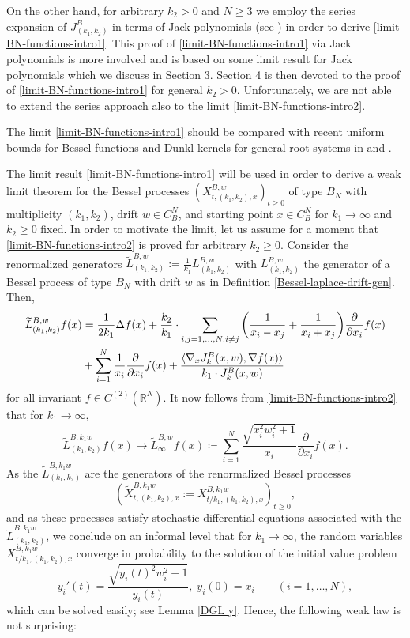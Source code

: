 \documentclass[reqno]{amsart}
\theoremstyle{plain}
\theoremstyle{definition}
\numberwithin{equation}{section}
\begin{document}
On the other hand, for arbitrary  $k_2>0$ and $N\ge3$
we  employ the series expansion of $J_{(k_1,k_2)}^B$ in terms of Jack polynomials (see \cite{Kan, FK, R4})
in order to derive \eqref{limit-BN-functions-intro1}.
This  proof of \eqref{limit-BN-functions-intro1} via Jack polynomials is more involved and is based on some limit result for Jack polynomials
which we  discuss in Section 3. Section 4 is then devoted to the proof of \eqref{limit-BN-functions-intro1} for general $k_2>0$.
Unfortunately, we are not able to extend the series approach also to the limit \eqref{limit-BN-functions-intro2}.

The limit \eqref{limit-BN-functions-intro1} should be compared with recent
uniform bounds for Bessel functions and Dunkl kernels for general root systems in \cite{L} and \cite{CLWW}.

The limit result 
\eqref{limit-BN-functions-intro1} will be used  in order to derive a weak limit theorem for the Bessel processes
$(X^{B,w}_{t,(k_1,k_2),x})_{t \geq 0}$ of type $B_N$ with multiplicity $(k_1,k_2)$,  drift $w \in C^N_B$, and starting point $x\in C^N_B$
for $k_1\to\infty$ and $k_2\ge0$ fixed. In order to motivate the limit, let us assume for a moment that
\eqref{limit-BN-functions-intro2} is proved for arbitrary $k_2\ge0$. Consider the renormalized
generators $\widetilde L_{(k_1,k_2)}^{B,w}:= \frac{1}{k_1} L_{(k_1,k_2)}^{B,w}$  with  $L_{(k_1,k_2)}^{B,w}$ the generator of a Bessel process of type $B_N$
with drift $w$ as  in Definition \ref{Bessel-laplace-drift-gen}. Then,
\begin{align}
\widetilde L_{(k_1,k_2)}^{B,w}f(x)&=\frac{1}{2k_1} \Delta f(x) + \frac{k_2}{k_1} \cdot \sum\limits_{i,j=1,\ldots,N, i \not=j} \bigg( \frac{1}{x_i-x_j}+\frac{1}{x_i+x_j} \bigg) \frac{\partial}{\partial x_i} f(x) \notag\\ 
&+  \sum\limits_{i=1}^N \frac{1}{x_i} \frac{\partial}{\partial x_i} f(x) + \frac{\langle \nabla_x J^B_k(x,w),\nabla f(x) \rangle}{k_1\cdot J^B_k(x,w)}
\end{align}
for all invariant $f\in C^{(2)}(\mathbb R^N)$. It now follows from
\eqref{limit-BN-functions-intro2} that for $k_1 \to \infty$,
\begin{equation}
  \widetilde L_{(k_1,k_2)}^{B,k_1 w}f(x) \to \widetilde{L}_{\infty}^{B,w}f(x) \coloneqq \sum\limits_{i=1}^N \frac{\sqrt{x_i^2w_i^2+1}}{x_i} \frac{\partial}{\partial x_i} f(x).
\end{equation}
As the $\widetilde  L_{(k_1,k_2)}^{B,k_1 w}$ are the generators of the renormalized Bessel processes
$$(\widetilde{X}^{B,k_1 w}_{t,(k_1,k_2),x} :=  X^{B,k_1 w}_{t/k_1,(k_1,k_2),x})_{t \geq 0},$$
and as these processes satisfy
stochastic differential equations associated with the  $\widetilde  L_{(k_1,k_2)}^{B,k_1 w}$, we conclude on an informal level that for $k_1 \to \infty$, the random variables 
$X^{B,k_1w}_{t/k_1,(k_1,k_2),x}$ converge in probability to the solution of the initial value problem
\begin{equation} \label{AWP y-intro}
y_i'(t)=\frac{\sqrt{y_i(t)^2w_i^2+1}}{y_i(t)}, \; y_i(0)=x_i \quad\quad(i=1,\ldots,N),\end{equation}
which can be solved easily; see Lemma  \ref{DGL y}. Hence, the following weak law is not surprising:
\end{document}
